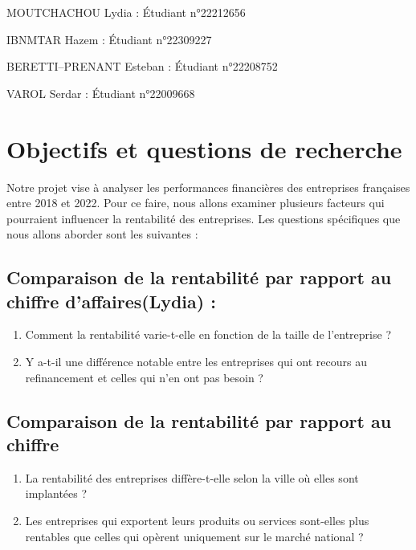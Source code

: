 \documentclass[mstat,12pt]{unswthesis}
\begin{document}
MOUTCHACHOU Lydia : Étudiant n°22212656

IBNMTAR Hazem : Étudiant n°22309227

BERETTI--PRENANT Esteban : Étudiant n°22208752

VAROL Serdar : Étudiant n°22009668

\bigskip

\section{Objectifs et questions de
recherche}\label{objectifs-et-questions-de-recherche}

Notre projet vise à analyser les performances financières des
entreprises françaises entre 2018 et 2022. Pour ce faire, nous allons
examiner plusieurs facteurs qui pourraient influencer la rentabilité des
entreprises. Les questions spécifiques que nous allons aborder sont les
suivantes :

\subsection{\texorpdfstring{\textbf{Comparaison de la rentabilité par
rapport au chiffre d'affaires(Lydia)
:}}{Comparaison de la rentabilité par rapport au chiffre d'affaires(Lydia) :}}\label{comparaison-de-la-rentabilituxe9-par-rapport-au-chiffre-daffaireslydia}

\begin{enumerate}
\def\labelenumi{\alph{enumi}.}
\item
  Comment la rentabilité varie-t-elle en fonction de la taille de
  l'entreprise ?
\item
  Y a-t-il une différence notable entre les entreprises qui ont recours
  au refinancement et celles qui n'en ont pas besoin ?
\end{enumerate}

\subsection{\texorpdfstring{\textbf{Comparaison de la rentabilité par
rapport au
chiffre}}{Comparaison de la rentabilité par rapport au chiffre}}\label{comparaison-de-la-rentabilituxe9-par-rapport-au-chiffre}

\begin{enumerate}
\def\labelenumi{\alph{enumi}.}
\item
  La rentabilité des entreprises diffère-t-elle selon la ville où elles
  sont implantées ?
\item
  Les entreprises qui exportent leurs produits ou services sont-elles
  plus rentables que celles qui opèrent uniquement sur le marché
  national ?
\end{enumerate}
\end{document}
